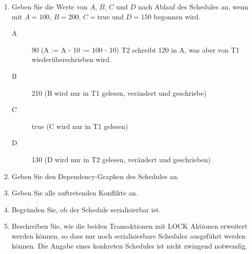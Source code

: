 \documentclass{lehramt-informatik-aufgabe}
\begin{document}
\begin{enumerate}


\item Geben Sie die Werte von $A$, $B$, $C$ und $D$ nach Ablauf des Schedules
an, wenn mit $A = 100$, $B = 200$, $C = \text{true}$ und $D = 150$ begonnen wird.

\begin{liAntwort}
\begin{description}
\item[A] 90 (A := A - 10 := 100 - 10) T2 schreibt 120 in A, was aber von T1 wiederüberschrieben wird.
\item[B] 210 (B wird nur in T1 gelesen, verändert und geschriebe)
\item[C] true (C wird nur in T1 gelesen)
\item[D] 130 (D wird nur in T2 gelesen, verändert und geschrieben)
\end{description}
\end{liAntwort}


\item Geben Sie den Dependency-Graphen des Schedules an.

\begin{liAntwort}

\end{liAntwort}


\item Geben Sie alle auftretenden Konflikte an.

\begin{liAntwort}

\end{liAntwort}


\item Begründen Sie, ob der Schedule serialisierbar ist.

\begin{liAntwort}

\end{liAntwort}


\item Beschreiben Sie, wie die beiden Transaktionen mit LOCK Aktionen
erweitert werden können, so dass nur noch serialisierbare Schedules
ausgeführt werden können. Die Angabe eines konkreten Schedules ist nicht
zwingend notwendig.

\begin{liAntwort}

\end{liAntwort}

\end{enumerate}
\end{document}
